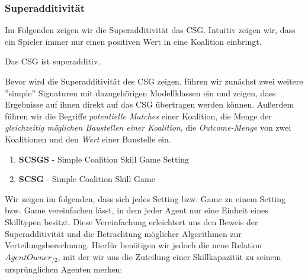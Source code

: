 \subsubsection{Superadditivität}
\label{supadd}
Im Folgenden zeigen wir die Superadditivität das CSG. Intuitiv zeigen wir, dass ein Spieler immer nur einen positiven Wert in eine Koalition einbringt.

\begin{lemma}[Superadditivität]
Das CSG ist superadditiv.
\end{lemma}

Bevor wird die Superadditivität des CSG zeigen, führen wir zunächst zwei weitere ''simple'' Signaturen mit dazugehörigen Modellklassen ein und zeigen, dass Ergebnisse auf ihnen direkt auf das CSG übertragen werden können. Außerdem führen wir die Begriffe \textit{potentielle Matches} einer Koalition, die Menge der \textit{gleichzeitig möglichen Baustellen einer Koalition}, die \textit{Outcome-Menge} von zwei Koalitionen und den \textit{Wert} einer Baustelle ein.

\begin{enumerate}
  \item \textbf{SCSGS} - Simple Coalition Skill Game Setting
  \item \textbf{SCSG} - Simple Coalition Skill Game
\end{enumerate}

\noindent
Wir zeigen im folgenden, dass sich jedes Setting bzw. Game zu einem Setting bzw. Game vereinfachen lässt, in dem jeder Agent nur eine Einheit eines Skilltypen besitzt. Diese Vereinfachung erleichtert uns den Beweis der Superadditivität und die Betrachtung möglicher Algorithmen zur Verteilungsberechnung. Hierfür benötigen wir jedoch die neue Relation $AgentOwner_{/2}$, mit der wir uns die Zuteilung einer Skillkapazität zu seinem ursprünglichen Agenten merken:

